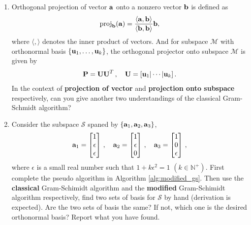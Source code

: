 \documentclass[english,onecolumn]{IEEEtran}
\begin{document}
\begin{enumerate}
\begin{algorithm}[htbp]
{ }
\end{algorithm}
	\item 
	Orthogonal projection of vector ${\bf a}$ onto a nonzero vector ${\bf b}$ is defined as
	\[
	\text{proj}_\mathbf{b}(\bf a)=\frac{\langle{\bf a},{\bf b}\rangle}{\langle{\bf b},{\bf b}\rangle}{\bf b},
	\]
	where $\langle,\rangle$ denotes the inner product of vectors.
	And for subspace $\mathcal{M}$ with 
	orthonormal basis $\{ {\bf u}_1,\ldots, {\bf u}_k \}$, the orthogonal projector onto subspace $\mathcal{M}$ is given by 
	\[
	{\bf P} = {\bf UU}^T\,,\quad {\bf U} = [{\bf u}_1|\cdots|{\bf u}_k]\,.
	\]
	In the context of \textbf{projection of vector} and \textbf{projection onto subspace} respectively, can you give another two understandings of the classical Gram-Schmidt algorithm?
	\item Consider the subspace $\mathcal{S}$ spaned by $\{{\bf a}_1, {\bf a}_2, {\bf a}_3\}$,
	\[
	{\bf a}_1 = \begin{bmatrix} 1 \\ \epsilon \\ \epsilon \\ \end{bmatrix}\,,\quad 
	{\bf a}_2 =  \begin{bmatrix}1 \\ \epsilon \\ 0\end{bmatrix}\,,\quad 
	{\bf a}_3 =  \begin{bmatrix}1 \\ 0 \\ \epsilon\end{bmatrix}\,,
	\]
	where $\epsilon$ is a small real number such that $1+k\epsilon^2 =1$ $(k\in\mathbb{N}^+)$. 
	First complete the pseudo algorithm in Algorithm \ref{alg:modified_gs}.
	Then use the \textbf{classical} Gram-Schimidt algorithm and the \textbf{modified} Gram-Schimidt algorithm respectively, find two sets of basis for $\mathcal{S}$ by hand (derivation is expected). Are the two sets of basis the same? If not, which one is the desired orthonormal basis? Report what you have found.
	\begin{algorithm}[htbp]

\end{algorithm}
\end{enumerate}
\end{document}

